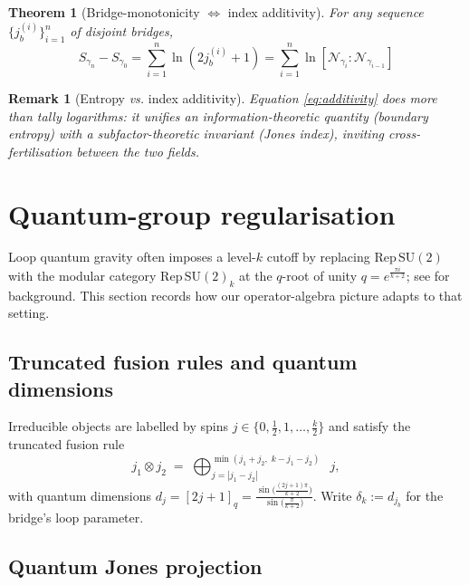 \documentclass[11pt]{article}
\newtheorem{theorem}{Theorem}[section]
\newtheorem{remark}{Remark}[section]
\begin{document}
\begin{theorem}[Bridge-monotonicity $\Leftrightarrow$ index additivity]
For any sequence $\{j_b^{(i)}\}_{i=1}^{n}$ of disjoint bridges,
\[
  S_{\gamma_n}-S_{\gamma_0}
  =\sum_{i=1}^{n}\ln\!(2j_b^{(i)}+1)
  =\sum_{i=1}^{n}\ln[\mathcal N_{\gamma_i}:\mathcal N_{\gamma_{i-1}}]
  \tag{\thetheorem}\label{eq:additivity}
\]
\end{theorem}

\begin{remark}[Entropy \emph{vs.} index additivity]\label{rem:additivity}
Equation \eqref{eq:additivity} does more than tally logarithms:
it unifies an \emph{information-theoretic} quantity 
(boundary entropy) with a \emph{subfactor-theoretic} invariant 
(Jones index), inviting cross-fertilisation between the two fields.
\end{remark}

\section{Quantum-group regularisation}\label{sec:qgroup}

Loop quantum gravity often imposes a level-$k$ cutoff by replacing
$\mathrm{Rep}\,\mathrm{SU}(2)$ with the modular category
$\mathrm{Rep}\,\mathrm{SU}(2)_k$ at the $q$-root of unity
$q=e^{\frac{\pi i}{k+2}}$; see \cite{BakalovKirillov} for background. This section records how our operator-algebra
picture adapts to that setting.

\subsection{Truncated fusion rules and quantum dimensions}

Irreducible objects are labelled by spins
$j\in\{0,\tfrac12,1,\dots,\tfrac{k}{2}\}$ and satisfy the truncated fusion
rule
\[
  j_1\otimes j_2
  \;=\;
  \bigoplus_{j=|j_1-j_2|}^{\min(j_1+j_2,\;k-j_1-j_2)}
  \!\!\!\!\!\!\!\!\!\!\!\!\!\!\!\!\;\;j,
\]
with quantum dimensions
\(
  d_j=[2j+1]_q
     =\frac{\sin\!\bigl(\frac{(2j+1)\pi}{k+2}\bigr)}
            {\sin\!\bigl(\frac{\pi}{k+2}\bigr)}.
\)
Write $\delta_k:=d_{j_b}$ for the bridge's loop parameter.

\subsection{Quantum Jones projection}
\end{document}
